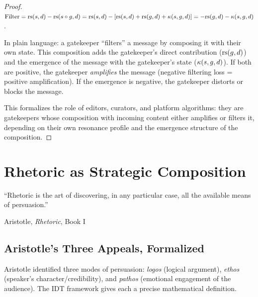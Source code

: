 \begin{proof}
$\text{Filter} = \mathrm{rs}(s, d) - \mathrm{rs}(s \circ g, d) = \mathrm{rs}(s, d) - [\mathrm{rs}(s, d) +
\mathrm{rs}(g, d) + \kappa(s, g, d)] = -\mathrm{rs}(g, d) - \kappa(s, g, d)$.

In plain language: a gatekeeper ``filters'' a message by composing it with
their own state.  This composition adds the gatekeeper's direct contribution
($\mathrm{rs}(g, d)$) and the emergence of the message with the gatekeeper's state
($\kappa(s, g, d)$).  If both are positive, the gatekeeper \emph{amplifies}
the message (negative filtering loss = positive amplification).  If the
emergence is negative, the gatekeeper distorts or blocks the message.

This formalizes the role of editors, curators, and platform algorithms:
they are gatekeepers whose composition with incoming content either
amplifies or filters it, depending on their own resonance profile and the
emergence structure of the composition.
\end{proof}


\chapter{Rhetoric as Strategic Composition}
\label{ch:rhetoric-deep}

\epigraph{``Rhetoric is the art of discovering, in any particular case, all
the available means of persuasion.''}%
{Aristotle, \emph{Rhetoric}, Book I}


\section{Aristotle's Three Appeals, Formalized}

Aristotle identified three modes of persuasion: \emph{logos} (logical
argument), \emph{ethos} (speaker's character/credibility), and \emph{pathos}
(emotional engagement of the audience).  The IDT framework gives each a
precise mathematical definition.

